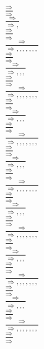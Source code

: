 \documentclass[11pt]{article}
\begin{document}
\begin{center}
\bigskip
\\$\frac{\Rightarrow }{\Rightarrow }$
\bigskip
\\$\frac{\Rightarrow }{\Rightarrow , }$
\bigskip
\\$\frac{\Rightarrow }{\Rightarrow }$
\bigskip
\\$\frac{\Rightarrow }{\Rightarrow , , , , , , , }$
\bigskip
\\$\frac{\Rightarrow }{\Rightarrow }$
\bigskip
\\$\frac{\Rightarrow }{\Rightarrow , , , }$
\bigskip
\\$\frac{\Rightarrow }{\Rightarrow }$
\bigskip
\\$\frac{\Rightarrow }{\Rightarrow , , , , , , , }$
\bigskip
\\$\frac{\Rightarrow }{\Rightarrow }$
\bigskip
\\$\frac{\Rightarrow }{\Rightarrow , , , }$
\bigskip
\\$\frac{\Rightarrow }{\Rightarrow }$
\bigskip
\\$\frac{\Rightarrow }{\Rightarrow , , , , , , , }$
\bigskip
\\$\frac{\Rightarrow }{\Rightarrow }$
\bigskip
\\$\frac{\Rightarrow }{\Rightarrow , , , }$
\bigskip
\\$\frac{\Rightarrow }{\Rightarrow }$
\bigskip
\\$\frac{\Rightarrow }{\Rightarrow , , , , , , , }$
\bigskip
\\$\frac{\Rightarrow }{\Rightarrow }$
\bigskip
\\$\frac{\Rightarrow }{\Rightarrow , , , }$
\bigskip
\\$\frac{\Rightarrow }{\Rightarrow }$
\bigskip
\\$\frac{\Rightarrow }{\Rightarrow , , , , , , , }$
\bigskip
\\$\frac{\Rightarrow }{\Rightarrow }$
\bigskip
\\$\frac{\Rightarrow }{\Rightarrow , , , }$
\bigskip
\\$\frac{\Rightarrow }{\Rightarrow }$
\bigskip
\\$\frac{\Rightarrow }{\Rightarrow , , , , , , , }$
\bigskip
\\$\frac{\Rightarrow }{\Rightarrow }$
\bigskip
\\$\frac{\Rightarrow }{\Rightarrow , , , }$
\bigskip
\\$\frac{\Rightarrow }{\Rightarrow }$
\bigskip
\\$\frac{\Rightarrow }{\Rightarrow , , , , , , , }$
\bigskip
\\$\frac{\Rightarrow }{\Rightarrow }$

\end{center}
\end{document}
